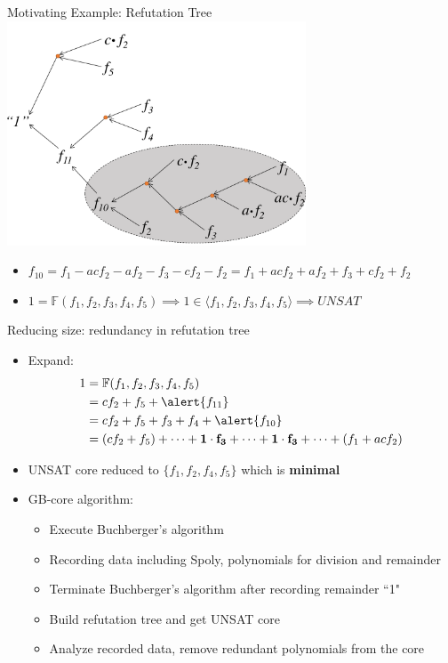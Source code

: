 \documentclass[xcolor=dvipsnames]{beamer}
\newcommand{\bi}{\begin{itemize}}
\newcommand{\ei}{\end{itemize}}
\newcommand{\F}{{\mathbb{F}}}
\begin{document}
\begin{frame}{\large{Motivating Example: Refutation Tree}}
\vspace{-0.1in}
\includegraphics[width=3.5in]{./refutation_1.pdf}
\pause
\bi
\item $f_{10}=f_1-acf_2-af_2-f_3-cf_2-f_2 = f_1+acf_2+af_2+f_3+cf_2+f_2$
\item $1 = \F(f_1,f_2,f_3,f_4,f_5)\implies 1 \in \langle f_1,f_2,f_3,f_4,f_5\rangle \implies UNSAT$
\ei
\end{frame}
\begin{frame}{\large{Reducing size: redundancy in refutation tree}}
\bi
\item Expand: \begin{align*}
		1 &= \F(f_1,f_2,f_3,f_4,f_5)\\
		&= cf_2+f_5+\alert{f_{11}}\\
		&=cf_2+f_5+f_3+f_4+\alert{f_{10}}\\
		&=(cf_2 + f_5) + \dots + \mathbf{1\cdot f_3} + \dots + \mathbf{1\cdot
  f_3}+ \dots + (f_1 + acf_2)
		\end{align*}
\item UNSAT core reduced to $\{f_1,f_2,f_4,f_5\}$ which is {\bf minimal}
\item \alert{GB-core algorithm}:
	\bi
	\item Execute Buchberger's algorithm
	\item Recording data including Spoly, polynomials for division and remainder
	\item Terminate Buchberger's algorithm after recording remainder ``1"
	\item Build refutation tree and get UNSAT core
	\item Analyze recorded data, remove redundant polynomials from the core
	\ei
\ei
\end{frame}
\end{document}
